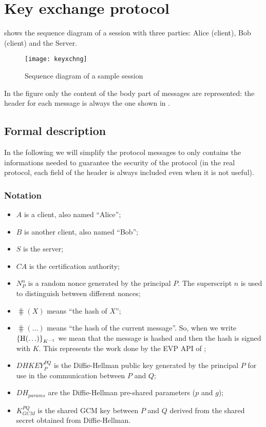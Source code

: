 \section{Key exchange protocol}\label{sec:keyxchng}

 shows the sequence diagram of a session with three
parties: Alice (client), Bob (client) and the Server.

\begin{figure}[htb]
	\texttt{[image: keyxchng]}
	\caption{Sequence diagram of a sample session}\label{fig:keyxchng}
\end{figure}

In the figure only the content of the body part of messages are represented: the
header for each message is always the one shown in .

\subsection{Formal description}\label{subsec:formal}

In the following we will simplify the protocol messages to only contains the
informations needed to guarantee the security of the protocol (in the real
protocol, each field of the header is always included even when it is not
useful).

\subsubsection{Notation}

\begin{itemize}
	\item \(A\) is a client, also named ``Alice'';
	\item \(B\) is another client, also named ``Bob'';
	\item \(S\) is the server;
	\item \(\mathit{CA}\) is the certification authority;
	\item \(N_P^n\) is a random nonce generated by the principal \(P\). The
		superscript \(n\) is used to distinguish between different
		nonces;
	\item \(\hash(X)\) means ``the hash of \(X\)'';
	\item \(\hash(\ldots)\) means ``the hash of the current message''. So,
		when we write \({\left\{\operatorname{H}(\ldots)\right\}}_{K^{-1}}\) we mean that the
		message is hashed and then the hash is signed with \(K\).
		This represents the work done by the EVP API of \openssl;
	\item \(\mathit{DHKEY}_P^{PQ}\) is the Diffie-Hellman public key
		generated by the principal \(P\) for use in the communication
		between \(P\) and \(Q\);
	\item \(\mathit{DH}_{params}\) are the Diffie-Hellman pre-shared
		parameters (\(p\) and \(g\));
	\item \(K_{GCM}^{PQ}\) is the shared GCM key between \(P\) and \(Q\)
		derived from the shared secret obtained from Diffie-Hellman.
\end{itemize}


